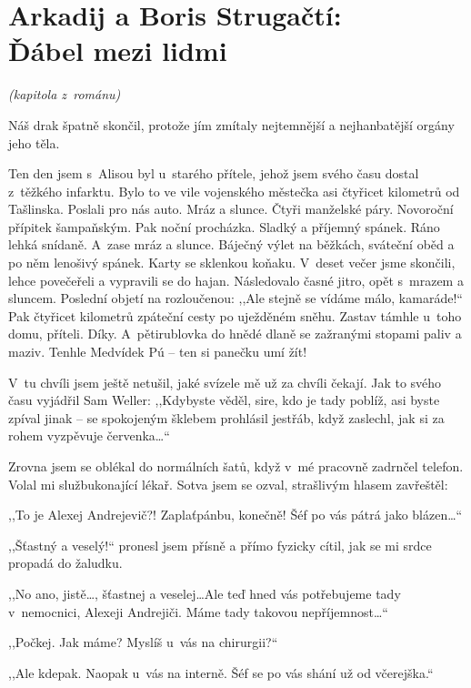 \section{Arkadij a Boris Strugačtí: \\ Ďábel mezi lidmi}

\noindent
\textit{(kapitola z románu)}

\medskip


\noindent
Náš drak špatně skončil, protože jím zmítaly nejtemnější a nejhanbatější orgány jeho těla.

Ten den jsem s~Alisou byl u~starého přítele, jehož jsem svého času dostal z~těžkého infarktu. Bylo to ve vile vojenského městečka asi čtyřicet kilometrů od Tašlinska. Poslali pro nás auto. Mráz a slunce. Čtyři manželské páry. Novoroční přípitek šampaňským. Pak noční procházka. Sladký a příjemný spánek. Ráno lehká snídaně. A~zase mráz a slunce. Báječný výlet na běžkách, sváteční oběd a po něm lenošivý spánek. Karty se sklenkou koňaku. V~deset večer jsme skončili, lehce povečeřeli a vypravili se do hajan. Následovalo časné jitro, opět s~mrazem a sluncem. Poslední objetí na rozloučenou: ,,Ale stejně se vídáme málo, kamaráde!“ Pak čtyřicet kilometrů zpáteční cesty po uježděném sněhu. Zastav támhle u~toho domu, příteli. Díky. A~pětirublovka do hnědé dlaně se zažranými stopami paliv a maziv. Tenhle Medvídek Pú – ten si panečku umí žít!

V~tu chvíli jsem ještě netušil, jaké svízele mě už za chvíli čekají. Jak to svého času vyjádřil Sam Weller: ,,Kdybyste věděl, sire, kdo je tady poblíž, asi byste zpíval jinak – se spokojeným šklebem prohlásil jestřáb, když zaslechl, jak si za rohem vyzpěvuje červenka\ldots“

Zrovna jsem se oblékal do normálních šatů, když v~mé pracovně zadrnčel telefon. Volal mi službukonající lékař. Sotva jsem se ozval, strašlivým hlasem zavřeštěl:

,,To je Alexej Andrejevič?! Zaplaťpánbu, konečně! Šéf po vás pátrá jako blázen\ldots“

,,Šťastný a veselý!“ pronesl jsem přísně a přímo fyzicky cítil, jak se mi srdce propadá do žaludku.

,,No ano, jistě\ldots, šťastnej a veselej\ldots Ale teď hned vás potřebujeme tady v~nemocnici, Alexeji Andrejiči. Máme tady takovou nepříjemnost\ldots“

,,Počkej. Jak máme? Myslíš u~vás na chirurgii?“

,,Ale kdepak. Naopak u~vás na interně. Šéf se po vás shání už od včerejška.“

